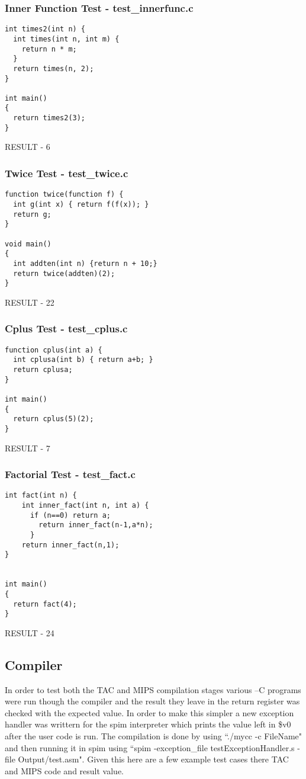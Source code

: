 \documentclass{article}
\begin{document}
\subsubsection{Inner Function Test - test\_innerfunc.c}
\begin{lstlisting}
int times2(int n) {
  int times(int n, int m) {
    return n * m;
  }
  return times(n, 2);
}

int main()
{
  return times2(3);
}
\end{lstlisting}
RESULT - 6

\subsubsection{Twice Test - test\_twice.c}
\begin{lstlisting}
function twice(function f) {
  int g(int x) { return f(f(x)); }
  return g;
}

void main()
{
  int addten(int n) {return n + 10;}
  return twice(addten)(2);
}
\end{lstlisting}
RESULT - 22

\subsubsection{Cplus Test - test\_cplus.c}
\begin{lstlisting}
function cplus(int a) {
  int cplusa(int b) { return a+b; }
  return cplusa;
}

int main()
{
  return cplus(5)(2);
}
\end{lstlisting}
RESULT - 7

\subsubsection{Factorial Test - test\_fact.c}
\begin{lstlisting}
int fact(int n) {
    int inner_fact(int n, int a) {
      if (n==0) return a;
        return inner_fact(n-1,a*n);
      }
    return inner_fact(n,1);
}


int main()
{
  return fact(4);
}
\end{lstlisting}
RESULT - 24


\subsection{Compiler}
In order to test both the TAC and MIPS compilation stages various --C programs
were run though the compiler and the result they leave in the return register
was checked with the expected value. In order to make this simpler a new
exception handler was writtern for the spim interpreter which prints the value
left in \$v0 after the user code is run. The compilation is done by using
``./mycc -c FileName" and then running it in spim using ``spim -exception\_file testExceptionHandler.s -file Output/test.asm".
Given this here are a few example test cases there TAC and MIPS code and result
value.
\end{document}
